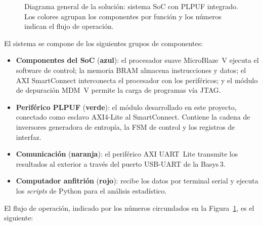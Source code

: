 \begin{figure}[htbp]
{%
  }
  \caption{Diagrama general de la solución: sistema SoC con PLPUF integrado.
    Los colores agrupan los componentes por función y los números indican el
    flujo de operación.}
  \label{fig:system_diagram}
\end{figure}

El sistema se compone de los siguientes grupos de componentes:

\begin{itemize}
  \item \textbf{Componentes del SoC} (\textcolor{blue!70}{\textbf{azul}}): el
    procesador suave MicroBlaze~V ejecuta el software de control; la memoria
    BRAM almacena instrucciones y datos; el AXI SmartConnect interconecta el
    procesador con los periféricos; y el módulo de depuración MDM~V permite
    la carga de programas vía JTAG.

  \item \textbf{Periférico PLPUF} (\textcolor{green!60!black}{\textbf{verde}}): el
    módulo desarrollado en este proyecto, conectado como esclavo AXI4-Lite al
    SmartConnect. Contiene la cadena de inversores generadora de entropía, la
    FSM de control y los registros de interfaz.

  \item \textbf{Comunicación} (\textcolor{orange!80!black}{\textbf{naranja}}): el
    periférico AXI UART~Lite transmite los resultados al exterior a través
    del puerto USB-UART de la Basys\,3.

  \item \textbf{Computador anfitrión} (\textcolor{red!60!black}{\textbf{rojo}}):
    recibe los datos por terminal serial y ejecuta los \textit{scripts} de
    Python para el análisis estadístico.
\end{itemize}

El flujo de operación, indicado por los números circundados en la
Figura~\ref{fig:system_diagram}, es el siguiente:

